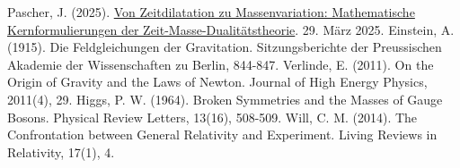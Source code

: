 \documentclass[12pt,a4paper]{article}
\begin{document}
\begin{thebibliography}{9}
		 Pascher, J. (2025). \href{https://github.com/jpascher/T0-Time-Mass-Duality/tree/main/2/pdf/Deutsch/Mathematische\%20Formulierungen\%20der\%20Zeit-Masse-Dualitätstheorie\%20mit\%20Lagrange.pdf}{Von Zeitdilatation zu Massenvariation: Mathematische Kernformulierungen der Zeit-Masse-Dualitätstheorie}. 29. März 2025.
		 Einstein, A. (1915). Die Feldgleichungen der Gravitation. Sitzungsberichte der Preussischen Akademie der Wissenschaften zu Berlin, 844-847.
		 Verlinde, E. (2011). On the Origin of Gravity and the Laws of Newton. Journal of High Energy Physics, 2011(4), 29.
		 Higgs, P. W. (1964). Broken Symmetries and the Masses of Gauge Bosons. Physical Review Letters, 13(16), 508-509.
		 Will, C. M. (2014). The Confrontation between General Relativity and Experiment. Living Reviews in Relativity, 17(1), 4.
	\end{thebibliography}
	
\end{document}
